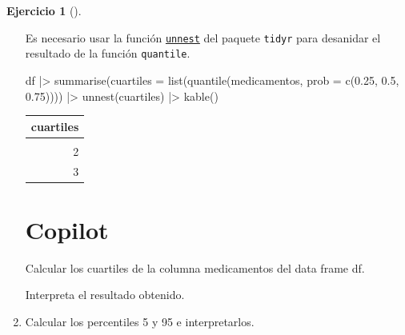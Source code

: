 \documentclass[
  a4paper,
]{scrreport}
\newenvironment{Shaded}{\begin{snugshade}}{\end{snugshade}}
\newcommand{\AttributeTok}[1]{\textcolor[rgb]{0.40,0.45,0.13}{#1}}
\newcommand{\ExtensionTok}[1]{\textcolor[rgb]{0.00,0.23,0.31}{#1}}
\newcommand{\FloatTok}[1]{\textcolor[rgb]{0.68,0.00,0.00}{#1}}
\newcommand{\FunctionTok}[1]{\textcolor[rgb]{0.28,0.35,0.67}{#1}}
\newcommand{\NormalTok}[1]{\textcolor[rgb]{0.00,0.23,0.31}{#1}}
\newcommand{\SpecialCharTok}[1]{\textcolor[rgb]{0.37,0.37,0.37}{#1}}
\theoremstyle{definition}
\newtheorem{exercise}{Ejercicio}[chapter]
\theoremstyle{remark}
\begin{document}
\begin{exercise}[]
\begin{enumerate}
\begin{tcolorbox}
  Es necesario usar la función
  \href{https://tidyr.tidyverse.org/reference/unnest.html}{\texttt{unnest}}
  del paquete \texttt{tidyr} para desanidar el resultado de la función
  \texttt{quantile}.

\begin{Shaded}
\begin{Highlighting}[]
\NormalTok{df }\SpecialCharTok{|\textgreater{}} \FunctionTok{summarise}\NormalTok{(}\AttributeTok{cuartiles =} \FunctionTok{list}\NormalTok{(}\FunctionTok{quantile}\NormalTok{(medicamentos, }\AttributeTok{prob =} \FunctionTok{c}\NormalTok{(}\FloatTok{0.25}\NormalTok{, }\FloatTok{0.5}\NormalTok{, }\FloatTok{0.75}\NormalTok{)))) }\SpecialCharTok{|\textgreater{}}
    \FunctionTok{unnest}\NormalTok{(cuartiles) }\SpecialCharTok{|\textgreater{}} 
    \FunctionTok{kable}\NormalTok{()}
\end{Highlighting}
\end{Shaded}

  \begin{longtable}[]{@{}r@{}}
  \toprule\noalign{}
  cuartiles \\
  \midrule\noalign{}
  \endhead
  \bottomrule\noalign{}
  \endlastfoot
  1 \\
  2 \\
  3 \\
  \end{longtable}

  \section{Copilot}

\begin{Shaded}
\begin{Highlighting}[]
\ExtensionTok{Calcular}\NormalTok{ los cuartiles de la columna medicamentos del data frame df.}

\ExtensionTok{Interpreta}\NormalTok{ el resultado obtenido.}
\end{Highlighting}
\end{Shaded}

  \end{tcolorbox}
\item
  Calcular los percentiles 5 y 95 e interpretarlos.

  \begin{tcolorbox}[enhanced jigsaw, colframe=quarto-callout-tip-color-frame, toprule=.15mm, bottomtitle=1mm, breakable, opacitybacktitle=0.6, toptitle=1mm, colback=white, bottomrule=.15mm, title=\textcolor{quarto-callout-tip-color}{\faLightbulb}\hspace{0.5em}{Solución}, arc=.35mm, left=2mm, titlerule=0mm, rightrule=.15mm, coltitle=black, leftrule=.75mm, opacityback=0, colbacktitle=quarto-callout-tip-color!10!white]


\end{tcolorbox}
\end{enumerate}
\end{exercise}
\end{document}
